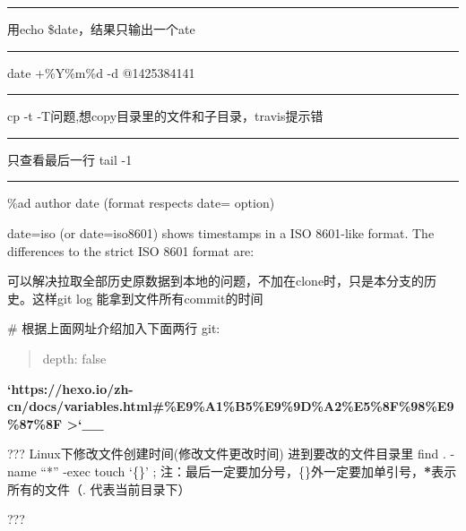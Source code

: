\documentclass[letterpaper,12pt,english]{sphinxmanual}
\begin{document}
\bigskip\hrule\bigskip


用echo \$date，结果只输出一个ate


\bigskip\hrule\bigskip


date +\%Y\%m\%d -d @1425384141


\bigskip\hrule\bigskip


cp -t -T问题,想copy目录里的文件和子目录，travis提示错


\bigskip\hrule\bigskip


只查看最后一行
tail -1


\bigskip\hrule\bigskip


\%ad
author date (format respects \textendash{}date= option)

\textendash{}date=iso (or \textendash{}date=iso8601) shows timestamps in a ISO 8601-like format. The differences to the strict ISO 8601 format are:

可以解决拉取全部历史原数据到本地的问题，不加在clone时，只是本分支的历史。这样git log 能拿到文件所有commit的时间

\# 根据上面网址介绍加入下面两行
git:
\begin{quote}

depth: false
\end{quote}

{\color{red}\bfseries{}{}`https://hexo.io/zh-cn/docs/variables.html\#\%E9\%A1\%B5\%E9\%9D\%A2\%E5\%8F\%98\%E9\%87\%8F
\textgreater{}{}`\_\_}

???
Linux下修改文件创建时间(修改文件更改时间)
进到要改的文件目录里
find . -name “*” -exec touch ‘\{\}’ ;
注：最后一定要加分号，\{\}外一定要加单引号，{\color{red}\bfseries{}*}表示所有的文件（. 代表当前目录下）

???





\end{document}
